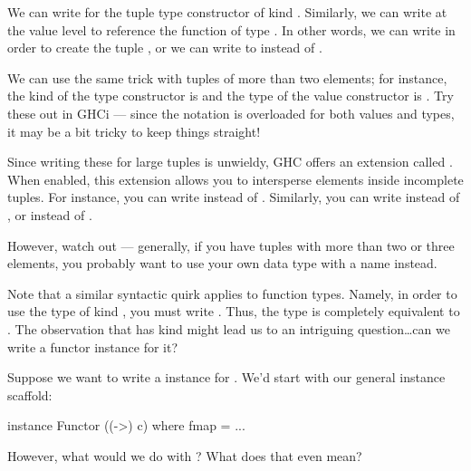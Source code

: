 \begin{tangent}[frametitle=Tuple Sections]
We can write  for the tuple type constructor of kind \inline{* -> *}. 
Similarly, we can write \inline{(,)} at the value level to reference the function of type 
. In other words, we can write  in order to create the
tuple , or we can write  to instead of .

We can use the same trick with tuples of more than two elements; for instance, the kind of the 
type constructor \inline{(,,)} is \inline{* -> * -> * -> *} and the type of the value constructor 
\inline{(,,)} is . Try these out in GHCi --- since the notation is
overloaded for both values and types, it may be a bit tricky to keep things straight!

Since writing these for large tuples is unwieldy, GHC offers an extension called
. When enabled, this extension allows you to intersperse elements inside
incomplete tuples. For instance, you can write  instead of .
Similarly, you can write  instead of , or  
instead of . 

However, watch out --- generally, if you have tuples with more than two or three elements, you
probably want to use your own data type with a name instead.
\end{tangent}

Note that a similar syntactic quirk applies to function types. Namely, in order to use the type
 of kind \inline{* -> *}, you must write . Thus, the type  is completely equivalent to . The observation that  has kind
\inline{* -> *} might lead us to an intriguing question\ldots can we write a functor instance for
it?

Suppose we want to write a  instance for . We'd start with our general
instance scaffold:
\begin{haskell}
instance Functor ((->) c) where
  fmap = ...
\end{haskell}
However, what would we do with ? What does that even mean?

